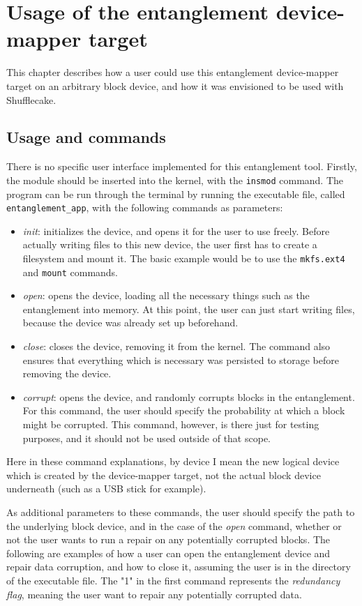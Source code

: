 \documentclass[a4paper,11pt,oneside]{report}
\begin{document}
\chapter{Usage of the entanglement device-mapper target}
This chapter describes how a user could use this entanglement device-mapper target on an arbitrary block device, and how it was envisioned to be used with Shufflecake. 

\section{Usage and commands}
There is no specific user interface implemented for this entanglement tool. Firstly, the module should be inserted into the kernel, with the \texttt{insmod} command. The program can be run through the terminal by running the executable file, called \texttt{entanglement\_app}, with the following commands as parameters: 
\begin{itemize}
    \item \emph{init}: initializes the device, and opens it for the user to use freely. Before actually writing files to this new device, the user first has to create a filesystem and mount it. The basic example would be to use the \texttt{mkfs.ext4} \cite{mkfs.ext4_man} and \texttt{mount} \cite{mount_man} commands. 
    \item \emph{open}: opens the device, loading all the necessary things such as the entanglement into memory. At this point, the user can just start writing files, because the device was already set up beforehand.
    \item \emph{close}: closes the device, removing it from the kernel. The command also ensures that everything which is necessary was persisted to storage before removing the device. 
    \item \emph{corrupt}: opens the device, and randomly corrupts blocks in the entanglement. For this command, the user should specify the probability at which a block might be corrupted. This command, however, is there just for testing purposes, and it should not be used outside of that scope. 
\end{itemize}

Here in these command explanations, by device I mean the new logical device which is created by the device-mapper target, not the actual block device underneath (such as a USB stick for example).

As additional parameters to these commands, the user should specify the path to the underlying block device, and in the case of the \emph{open} command, whether or not the user wants to run a repair on any potentially corrupted blocks. The following are examples of how a user can open the entanglement device and repair data corruption, and how to close it, assuming the user is in the directory of the executable file. The "1" in the first command represents the \emph{redundancy flag}, meaning the user want to repair any potentially corrupted data. 
\end{document}
